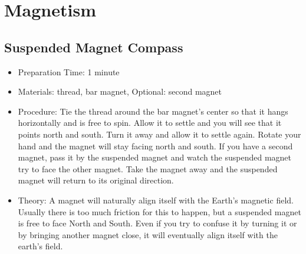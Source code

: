 \section{Magnetism}

\subsection{Suspended Magnet Compass}
\begin{itemize}
\item{Preparation Time: 1 minute}
\item{Materials: thread, bar magnet, Optional: second magnet}
\item{Procedure: Tie the thread around the bar magnet’s center so that it hangs horizontally and is free to spin. Allow it to settle and you will see that it points north and south. Turn it away and allow it to settle again. Rotate your hand and the magnet will stay facing north and south. If you have a second magnet, pass it by the suspended magnet and watch the suspended magnet try to face the other magnet. Take the magnet away and the suspended magnet will return to its original direction.}
\item{Theory: A magnet will naturally align itself with the Earth’s magnetic field. Usually there is too much friction for this to happen, but a suspended magnet is free to face North and South. Even if you try to confuse it by turning it or by bringing another magnet close, it will eventually align itself with the earth’s field.}
\end{itemize}

